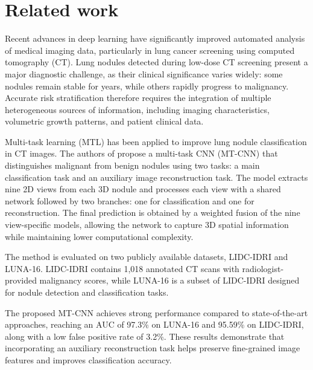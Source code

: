 
\chapter{Related work}
\label{chapter:stateOfArt}



Recent advances in deep learning have significantly improved automated analysis of medical imaging data, particularly in lung cancer screening using computed tomography (CT). Lung nodules detected during low-dose CT screening present a major diagnostic challenge, as their clinical significance varies widely: some nodules remain stable for years, while others rapidly progress to malignancy. Accurate risk stratification therefore requires the integration of multiple heterogeneous sources of information, including imaging characteristics, volumetric growth patterns, and patient clinical data.

Multi-task learning (MTL) has been applied to improve lung nodule classification in CT images. The authors of \cite{zhai2020} propose a multi-task CNN (MT-CNN) that distinguishes malignant from benign nodules using two tasks: a main classification task and an auxiliary image reconstruction task. The model extracts nine 2D views from each 3D nodule and processes each view with a shared network followed by two branches: one for classification and one for reconstruction. The final prediction is obtained by a weighted fusion of the nine view-specific models, allowing the network to capture 3D spatial information while maintaining lower computational complexity.

The method is evaluated on two publicly available datasets, LIDC-IDRI and LUNA-16. LIDC-IDRI contains 1,018 annotated CT scans with radiologist-provided malignancy scores, while LUNA-16 is a subset of LIDC-IDRI designed for nodule detection and classification tasks.

The proposed MT-CNN achieves strong performance compared to state-of-the-art approaches, reaching an AUC of 97.3\% on LUNA-16 and 95.59\% on LIDC-IDRI, along with a low false positive rate of 3.2\%. These results demonstrate that incorporating an auxiliary reconstruction task helps preserve fine-grained image features and improves classification accuracy.

